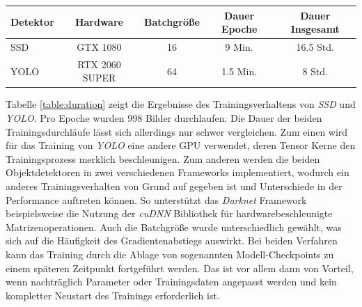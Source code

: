 \begin{center}
	\begin{tabular}[H]{l|c|c|c|c}
		Detektor & Hardware & Batchgröße & Dauer Epoche & Dauer Insgesamt \\
		\hline
		SSD & GTX 1080 & 16 & 9 Min. & 16.5 Std. \\
		YOLO & RTX 2060 SUPER & 64 & 1.5 Min. & 8 Std.
	\end{tabular}
	\label{table:duration}
\end{center}

Tabelle \ref{table:duration} zeigt die Ergebnisse des Trainingsverhaltens von \textit{SSD} und \textit{YOLO}. Pro Epoche wurden 998 Bilder durchlaufen. Die Dauer der beiden Trainingsdurchläufe lässt sich allerdings nur schwer vergleichen. Zum einen wird für das Training von \textit{YOLO} eine andere GPU verwendet, deren Tensor Kerne den Trainingsprozess merklich beschleunigen. Zum anderen werden die beiden Objektdetektoren in zwei verschiedenen Frameworks implementiert, wodurch ein anderes Trainingsverhalten von Grund auf gegeben ist und Unterschiede in der Performance auftreten können. So unterstützt das \textit{Darknet} Framework beispielsweise die Nutzung der \textit{cuDNN} Bibliothek für hardwarebeschleunigte Matrizenoperationen. Auch die Batchgröße wurde unterschiedlich gewählt, was sich auf die Häufigkeit des Gradientenabstiegs auswirkt. Bei beiden Verfahren kann das Training durch die Ablage von sogenannten Modell-Checkpoints zu einem späteren Zeitpunkt fortgeführt werden. Das ist vor allem dann von Vorteil, wenn nachträglich Parameter oder Trainingsdaten angepasst werden und kein kompletter Neustart des Trainings erforderlich ist.
